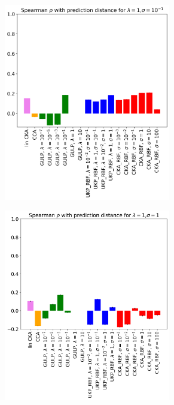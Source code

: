 \documentclass[11pt]{article}
\theoremstyle{plain}
\begin{document}
\begin{figure}[!h]
    \vspace{0.5cm}  %
    
    \begin{subfigure}[b]{0.45\textwidth}
        \includegraphics[width=0.8\textwidth]{Appendix figures/mnist_experiments/krrgen/png/generalization(includingCKARBF)_lambda1_sigma0.1.png}
    \end{subfigure}
    \hfill
    \begin{subfigure}[b]{0.45\textwidth}
        \includegraphics[width=0.8\textwidth]{Appendix figures/mnist_experiments/krrgen/png/generalization(includingCKARBF)_lambda1_sigma1.png}
    \end{subfigure}
    

\end{figure}
\end{document}
